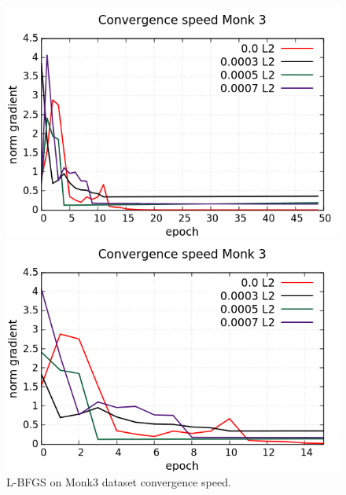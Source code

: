 \begin{figure}[H]
	\centering
	\begin{minipage}[t]{0.5\linewidth}
		\includegraphics[width=\linewidth]{data/LBFGS/Monk3/Monk3_LBFGS_CS_standard.png}
	\end{minipage}%
	\begin{minipage}[t]{0.5\linewidth}
		\includegraphics[width=\linewidth]{data/LBFGS/Monk3/Monk3_LBFGS_CS_zoom.png}
	\end{minipage}
	\caption{L-BFGS on Monk3 dataset convergence speed.}
\end{figure}
